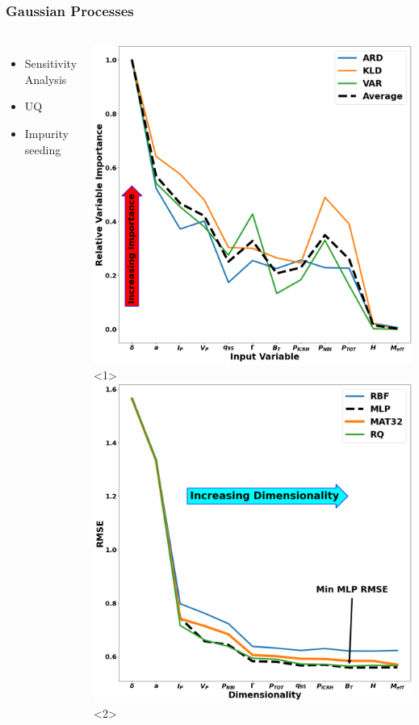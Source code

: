 \documentclass{beamer}
\begin{document}
\begin{frame}
\frametitle{Gaussian Processes}
\begin{columns}
\begin{itemize}
	\item<1-> Sensitivity Analysis
	\item<3-> UQ 
	\item<4-> Impurity seeding 
\end{itemize}
\includegraphics[scale=0.2]{../src/GP_sensitivity_analysis_final_V1}<1>
\includegraphics[scale=0.2]{../src/final_GP_dim_v2}<2>

\end{columns}
\end{frame}
\end{document}

